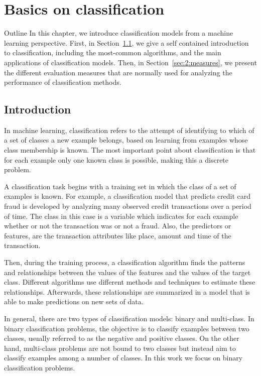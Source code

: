 \chapter{Basics on classification}\label{ch:2}

\begin{remark}{Outline}
In this chapter, we introduce classification models from a machine learning perspective. 
First, in Section~\ref{sec:2:classification}, we give a self contained introduction to 
classification, including the most-common algorithms, and the main applications of 
classification models. Then, in Section~\ref{sec:2:measures}, we present the different evaluation 
measures that are normally used for analyzing the performance of classification methods.
\end{remark}

\section{Introduction}
\label{sec:2:classification}

In machine learning, classification refers to the attempt of identifying to which of a set of 
classes a new example belongs, based on learning from examples whose class membership is known. 
The most important point about classification is that for each example only one known class is 
possible, making this a discrete problem. 

A classification task begins with a training set in which the class of a set of examples is known. 
For example, a classification model that predicts credit card fraud is developed by analyzing 
many observed credit transactions over a period of time. The class in this case is a variable which 
indicates for each example whether or not the transaction was or not a fraud. Also, the predictors 
or features, are the transaction attributes like place, amount and time of the transaction.

Then, during the training process, a classification algorithm finds the patterns and relationships 
between the values of the features and the values of the target class. Different algorithms use 
different methods and techniques to estimate these relationships. Afterwards, these relationships 
are summarized in a model that is able to make predictions on new sets of data.

In general, there are two types of classification models: binary and multi-class. In binary 
classification problems, the objective is to classify examples between two classes, usually 
referred to as the negative and positive classes. On the other hand, multi-class problems are not 
bound to two classes but instead aim to classify examples among a number of classes. In this work we 
focus on binary classification problems.

